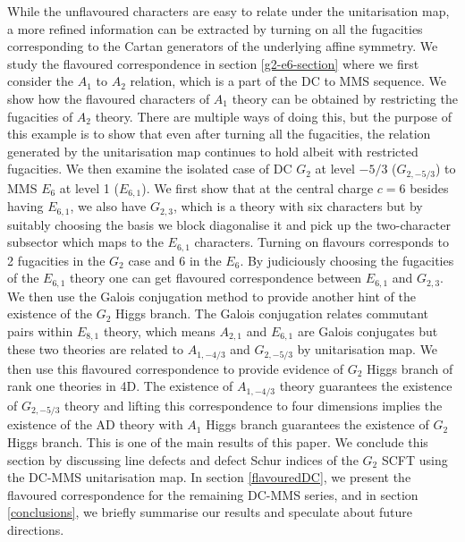 \documentclass[a4paper,12pt]{article}
\begin{document}
While the unflavoured characters are easy to relate under the unitarisation map, a more refined information can be extracted by turning on all the fugacities corresponding to the Cartan generators of the underlying affine symmetry.  We study the flavoured correspondence in section \ref{g2-e6-section} where we first consider the $A_1$ to $A_2$ relation, which is a part of the DC to MMS sequence. We show how the flavoured characters of $A_1$ theory can be obtained by restricting the fugacities of $A_2$ theory. There are multiple ways of doing this, but the purpose of this example is to show that even after turning all the fugacities, the relation generated by the unitarisation map continues to hold albeit with restricted fugacities. We then examine the isolated case of DC $G_2$ at level $-5/3$ ($G_{2,-5/3}$) to MMS $E_6$ at level 1 ($E_{6,1}$).  We first show that at the central charge $c=6$ besides having $E_{6,1}$, we also have $G_{2,3}$, which is a theory with six characters but by suitably choosing the basis we block diagonalise it and pick up the two-character subsector which maps to the $E_{6,1}$ characters.  Turning on flavours corresponds to 2 fugacities in the $G_2$ case and 6 in the $E_6$. By judiciously choosing the fugacities of the $E_{6,1}$ theory one can get flavoured correspondence between $E_{6,1}$ and $G_{2,3}$. We then use the Galois conjugation method to provide another hint of the existence of the $G_2$ Higgs branch. The Galois conjugation relates commutant pairs within $E_{8,1}$ theory, which means $A_{2,1}$ and $E_{6,1}$ are Galois conjugates but these two theories are related to $A_{1,-4/3}$ and $G_{2,-5/3}$ by unitarisation map.  We then use this flavoured correspondence to provide evidence of $G_2$ Higgs branch of rank one theories in 4D. The existence of $A_{1,-4/3}$ theory guarantees the existence of $G_{2,-5/3}$ theory and lifting this correspondence to four dimensions implies the existence of the AD theory with $A_1$ Higgs branch guarantees the existence of $G_2$ Higgs branch. This is one of the main results of this paper. We conclude this section by discussing line defects and defect Schur indices of the $G_2$ SCFT using the DC-MMS unitarisation map. In section \ref{flavouredDC}, we present the flavoured correspondence for the remaining DC-MMS series, and in section \ref{conclusions}, we briefly summarise our results and speculate about future directions.

\end{document}
